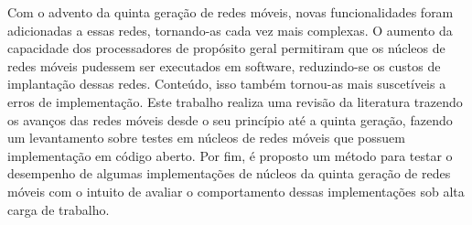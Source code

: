 Com o advento da quinta geração de redes móveis, novas funcionalidades foram adicionadas a essas redes, tornando-as cada vez mais complexas.
O aumento da capacidade dos processadores de propósito geral permitiram que os núcleos de redes móveis pudessem ser executados em software, reduzindo-se os custos de implantação dessas redes. Conteúdo, isso também tornou-as mais suscetíveis a erros de implementação.
Este trabalho realiza uma revisão da literatura trazendo os avanços das redes móveis desde o seu princípio até a quinta geração, fazendo um levantamento sobre testes em núcleos de redes móveis que possuem implementação em código aberto.
Por fim, é proposto um método para testar o desempenho de algumas implementações de núcleos da quinta geração de redes móveis com o intuito de avaliar o comportamento dessas implementações sob alta carga de trabalho.
